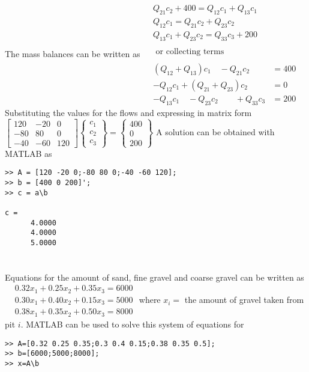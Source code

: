 \documentclass[../main.tex]{subfiles}
\begin{document}
\begin{enumerate}[label=\bfseries(\alph*)]
\section{}
The mass balances can be written as
\bigbreak$
\begin{aligned}
& Q_{21} c_{2}+400=Q_{12} c_{1}+Q_{13} c_{1} \\
& Q_{12} c_{1}=Q_{21} c_{2}+Q_{23} c_{2} \\
& Q_{13} c_{1}+Q_{23} c_{2}=Q_{33} c_{3}+200 \\\\
& \text { or collecting terms } \\\\
& \left(Q_{12}+Q_{13}\right) c_{1} \quad-Q_{21} c_{2} \quad&=400 \\
& -Q_{12} c_{1}+\left(Q_{21}+Q_{23}\right) c_{2}&=0 \\
& -Q_{13} c_{1} \quad-Q_{23} c_{2}\quad\quad+Q_{33} c_{3}&=200 
\end{aligned}$
\bigbreak
Substituting the values for the flows and expressing in matrix form
\bigbreak
$\left[\begin{array}{ccc}
120 & -20 & 0 \\
-80 & 80 & 0 \\
-40 & -60 & 120
\end{array}\right]\left\{\begin{array}{l}
c_{1} \\
c_{2} \\
c_{3}
\end{array}\right\}=\left\{\begin{array}{c}
400 \\
0 \\
200
\end{array}\right\}$
\bigbreak
A solution can be obtained with MATLAB as
\bigbreak
\begin{lstlisting}[numbers=none]
>> A = [120 -20 0;-80 80 0;-40 -60 120];
>> b = [400 0 200]';
>> c = a\b

c =
 	  4.0000
 	  4.0000
 	  5.0000

\end{lstlisting}
\bigbreak


\section{}
Equations for the amount of sand, fine gravel and coarse gravel can be written as
\bigbreak$
\begin{aligned}
&0.32 x_{1}+0.25 x_{2}+0.35 x_{3}=6000 \\
&0.30 x_{1}+0.40 x_{2}+0.15 x_{3}=5000 \\
&0.38 x_{1}+0.35 x_{2}+0.50 x_{3}=8000
\end{aligned}$
\bigbreak
where $x_{i}=$ the amount of gravel taken from pit $i$. MATLAB can be used to solve this system of equations for
\bigbreak
\begin{lstlisting}[numbers=none]
>> A=[0.32 0.25 0.35;0.3 0.4 0.15;0.38 0.35 0.5];
>> b=[6000;5000;8000];
>> x=A\b


\end{lstlisting}
\end{enumerate}
\end{document}
